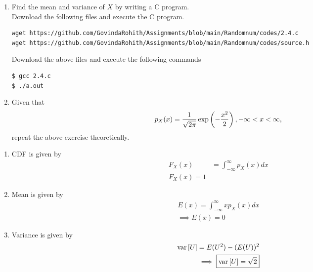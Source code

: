 \documentclass[journal,12pt,twocolumn]{IEEEtran}
\begin{document}
\begin{enumerate}[label=\thesection.\arabic*
,ref=\thesection.\theenumi]
\begin{enumerate}
    \item Area under the curve is unity.
\end{enumerate}
\item Find the mean and variance of $X$ by writing a C program.\\
\solution Download the following files and execute the  C program.
\begin{lstlisting}
wget https://github.com/GovindaRohith/Assignments/blob/main/Randomnum/codes/2.4.c
wget https://github.com/GovindaRohith/Assignments/blob/main/Randomnum/codes/source.h
\end{lstlisting}
Download the above files and execute the following commands
\begin{lstlisting}
$ gcc 2.4.c
$ ./a.out
\end{lstlisting}
\item Given that 
\begin{align}
p_{X}(x) = \frac{1}{\sqrt{2\pi}}\exp\left(-\frac{x^2}{2}\right), -\infty < x < \infty,
\end{align}
repeat the above exercise theoretically.
\end{enumerate}
\solution 
\begin{enumerate}
    \item CDF is given by 
    \begin{align}
        F_X(x)&=\int_{-\infty}^{\infty}p_X(x)dx\\
        \boxed{F_X(x)=1}
    \end{align}
    \item Mean is given by
    \begin{align}
        E(x)=\int_{-\infty}^{\infty}xp_X(x)dx\\
        \implies \boxed{E(x)=0}
    \end{align}
    \item Variance is given by
    \begin{align}
        \text{var}{}\left[U\right]=E(U^2)-(E(U))^2\\
        \implies\boxed{\text{var}{}\left[U\right]=\sqrt{2}}
    \end{align}
\end{enumerate}
\end{document}
